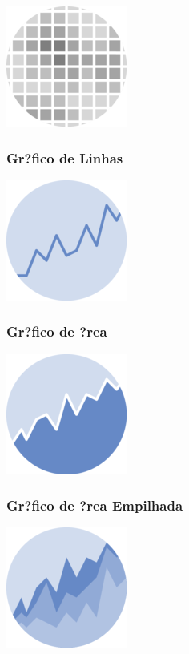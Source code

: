 \documentclass[]{article}
\begin{document}
\includegraphics{img/heatmap.png}

\hypertarget{grfico-de-linhas}{%
\subsubsection{Gr?fico de Linhas}\label{grfico-de-linhas}}

\includegraphics{img/line_chart.png}

\hypertarget{grfico-de-rea}{%
\subsubsection{Gr?fico de ?rea}\label{grfico-de-rea}}

\includegraphics{img/area_chart.png}

\hypertarget{grfico-de-rea-empilhada}{%
\subsubsection{Gr?fico de ?rea
Empilhada}\label{grfico-de-rea-empilhada}}

\includegraphics{img/stacked_area.png}
\end{document}
